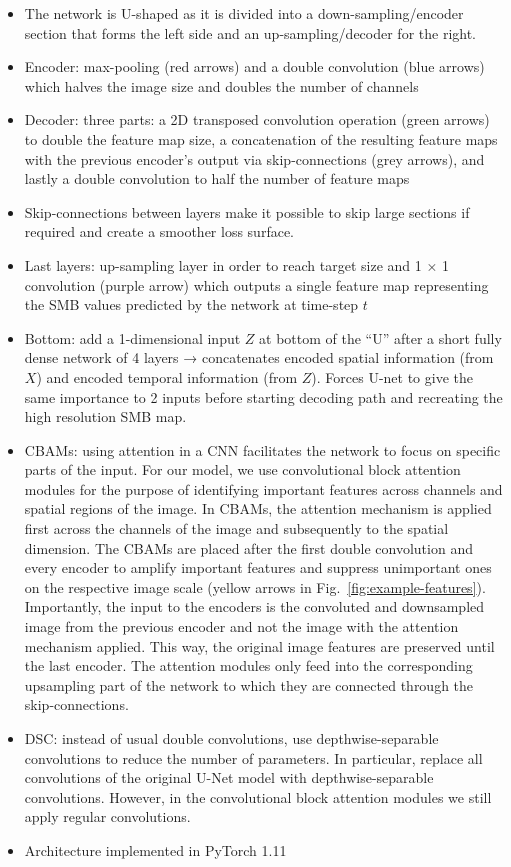 \documentclass[a4paper,11pt,oneside]{report}
\begin{document}
\begin{itemize}
    \item The network is U-shaped as it is divided into a down-sampling/encoder section that forms the left side and an up-sampling/decoder for the right.
    \item Encoder: max-pooling (red arrows) and a double convolution (blue arrows) which halves the image size and doubles the number of channels
    \item Decoder: three parts: a 2D transposed convolution operation (green arrows) to double the feature map size, a concatenation of the resulting feature maps with the previous encoder’s output via skip-connections (grey arrows), and lastly a double convolution to half the number of feature maps
    \item  Skip-connections between layers make it possible to skip large sections if required and create a smoother loss surface. 
    \item  Last layers: up-sampling layer in order to reach target size and 1 × 1 convolution (purple arrow) which outputs a single feature map representing the SMB values predicted by the network at time-step $t$
    \item Bottom: add a 1-dimensional input $Z$ at bottom of the “U” after a short fully dense network of 4 layers → concatenates encoded spatial information (from $X$) and encoded temporal information (from $Z$). Forces U-net to give the same importance to 2 inputs before starting decoding path and recreating the high resolution SMB map. 
    \item CBAMs: using attention in a CNN facilitates the network to focus on specific parts of the input. For our model, we use convolutional block attention modules for the purpose of identifying important features across channels and spatial regions of the image. In CBAMs, the attention mechanism is applied first across the channels of the image and subsequently to the spatial dimension. The CBAMs are placed after the first double convolution and every encoder to amplify important features and suppress unimportant ones on the respective image scale (yellow arrows in Fig.~\ref{fig:example-features}). Importantly, the input to the encoders is the convoluted and downsampled image from the previous encoder and not the image with the attention mechanism applied. This way, the original image features are preserved until the last encoder. The attention modules only feed into the corresponding upsampling part of the network to which they are connected through the skip-connections.
    \item DSC: instead of usual double convolutions, use depthwise-separable convolutions to reduce the number of parameters. In particular, replace all convolutions of the original U-Net model with depthwise-separable convolutions. However, in the convolutional block attention modules we still apply regular convolutions. 
    \item Architecture implemented in PyTorch 1.11
\end{itemize}
\end{document}
